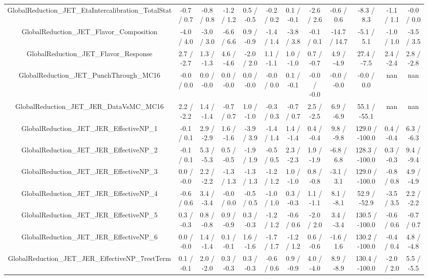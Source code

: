 \begin{table}[htbp]
\begin{center}
\begin{tabular}{|c|c|c|c|c|c|c|c|c|c|c|c|}
  GlobalReduction_JET_EtaIntercalibration_TotalStat & -0.7 / 0.7 & -0.8 / 0.8 & -1.2 / 1.2 & 0.5 / -0.5 & -0.2 / 0.2 & 0.1 / -0.1 & -2.6 / 2.6 & -0.6 / 0.6 & -8.3 / 8.3 & -1.1 / 1.1 & -0.0 / 0.0 \\ 
  GlobalReduction_JET_Flavor_Composition & -4.0 / 4.0 & -3.0 / 3.0 & -6.6 / 6.6 & 0.9 / -0.9 & -1.4 / 1.4 & -3.8 / 3.8 & -0.1 / 0.1 & -14.7 / 14.7 & -5.1 / 5.1 & -1.0 / 1.0 & -3.5 / 3.5 \\ 
  GlobalReduction_JET_Flavor_Response & 2.7 / -2.7 & 1.3 / -1.3 & 4.6 / -4.6 & -2.0 / 2.0 & 1.1 / -1.1 & 1.0 / -1.0 & 0.7 / -0.7 & 4.9 / -4.9 & 27.4 / -7.5 & 2.4 / -2.4 & 2.8 / -2.8 \\ 
  GlobalReduction_JET_PunchThrough_MC16 & -0.0 / 0.0 & 0.0 / -0.0 & 0.0 / -0.0 & 0.0 / -0.0 & -0.0 / 0.0 & 0.1 / -0.1 & -0.0 / -0.0 & -0.0 / -0.0 & -0.0 / 0.0 &    nan    &    nan    \\ 
  GlobalReduction_JET_JER_DataVsMC_MC16 & 2.2 / -2.2 & 1.4 / -1.4 & -0.7 / 0.7 & 1.0 / -1.0 & -0.3 / 0.3 & -0.7 / 0.7 & 2.5 / -2.5 & 6.9 / -6.9 & 55.1 / -55.1 &    nan    &    nan    \\ 
  GlobalReduction_JET_JER_EffectiveNP_1 & -0.1 / 0.1 & 2.9 / -2.9 & 1.6 / -1.6 & -3.9 / 3.9 & -1.4 / 1.4 & 1.4 / -1.4 & 0.4 / -0.4 & 9.8 / -9.8 & 129.0 / -100.0 & 0.4 / -0.4 & 6.3 / -6.3 \\ 
  GlobalReduction_JET_JER_EffectiveNP_2 & -0.1 / 0.1 & 5.3 / -5.3 & 0.5 / -0.5 & -1.9 / 1.9 & -0.5 / 0.5 & 2.3 / -2.3 & 1.9 / -1.9 & -6.8 / 6.8 & 128.3 / -100.0 & 0.3 / -0.3 & 9.4 / -9.4 \\ 
  GlobalReduction_JET_JER_EffectiveNP_3 & 0.0 / -0.0 & 2.2 / -2.2 & -1.3 / 1.3 & -1.3 / 1.3 & -1.2 / 1.2 & 1.0 / -1.0 & 0.8 / -0.8 & -3.1 / 3.1 & 129.0 / -100.0 & -0.8 / 0.8 & 4.9 / -4.9 \\ 
  GlobalReduction_JET_JER_EffectiveNP_4 & -0.6 / 0.6 & 3.4 / -3.4 & -0.0 / 0.0 & -0.5 / 0.5 & -1.0 / 1.0 & 0.3 / -0.3 & 1.1 / -1.1 & 8.1 / -8.1 & 52.9 / -52.9 & -3.5 / 3.5 & 2.2 / -2.2 \\ 
  GlobalReduction_JET_JER_EffectiveNP_5 & 0.3 / -0.3 & 0.8 / -0.8 & 0.9 / -0.9 & 0.3 / -0.3 & -1.2 / 1.2 & -0.6 / 0.6 & -2.0 / 2.0 & 3.4 / -3.4 & 130.5 / -100.0 & -0.6 / 0.6 & -0.7 / 0.7 \\ 
  GlobalReduction_JET_JER_EffectiveNP_6 & 0.0 / -0.0 & 1.4 / -1.4 & 0.1 / -0.1 & 1.6 / -1.6 & -1.7 / 1.7 & -1.2 / 1.2 & 0.6 / -0.6 & -1.6 / 1.6 & 130.2 / -100.0 & -0.4 / 0.4 & 4.8 / -4.8 \\ 
  GlobalReduction_JET_JER_EffectiveNP_7restTerm & 0.1 / -0.1 & 2.0 / -2.0 & 0.3 / -0.3 & 0.3 / -0.3 & -0.6 / 0.6 & 0.9 / -0.9 & 4.0 / -4.0 & 8.9 / -8.9 & 130.4 / -100.0 & -2.0 / 2.0 & 5.5 / -5.5 \\ 

\end{tabular}
\end{center}
\end{table}
